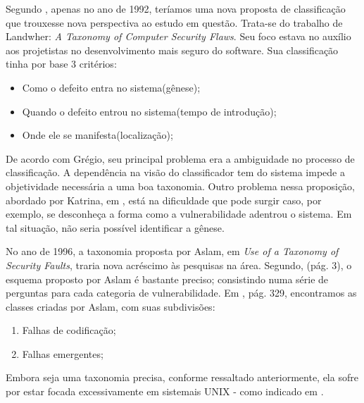 			Segundo \cite{Gregio2005}, apenas no ano de 1992, teríamos uma nova proposta
			de classificação que trouxesse nova perspectiva ao estudo em questão.
			Trata-se do trabalho de Landwher: \textsl{A Taxonomy of Computer Security Flaws}.
			Seu foco estava no auxílio aos projetistas no desenvolvimento mais seguro do software.
			Sua classificação tinha por base 3 critérios:
			\begin{itemize}
				\item{Como o defeito entra no sistema(gênese);}
				\item{Quando o defeito entrou no sistema(tempo de introdução);}
				\item{Onde ele se manifesta(localização);}
			\end{itemize}
			De acordo com Grégio, seu principal problema era a ambiguidade no processo de classificação.
			A dependência na visão do classificador tem do sistema impede a objetividade necessária
			a uma boa taxonomia.
			Outro problema nessa proposição, abordado por Katrina, em \cite{Katrina2005}, está
			na dificuldade que pode surgir caso, por exemplo, se desconheça a forma como a vulnerabilidade
			adentrou o sistema. Em tal situação, não seria possível identificar a gênese.
			
			
			No ano de 1996, a taxonomia proposta por Aslam, em \textsl{Use of a Taxonomy of Security Faults},
			traria nova acréscimo às pesquisas na área. Segundo, \cite{Katrina2005}(pág. 3), o esquema
			proposto por Aslam é bastante preciso; consistindo numa série de perguntas para cada
			categoria de vulnerabilidade. Em \cite{Gregio2005}, pág. 329, encontramos as 
			classes criadas por Aslam, com suas subdivisões:
			\begin{enumerate}
				\item{Falhas de codificação;}
				\item{Falhas emergentes;}
			\end{enumerate}
			Embora seja uma taxonomia precisa, conforme ressaltado anteriormente, ela sofre
			por estar focada excessivamente em sistemais UNIX - como indicado em \cite{Katrina2005}.
			

